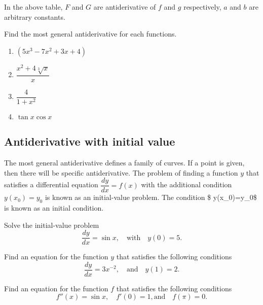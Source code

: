 In the above table, \(F\) and \(G\) are antiderivative of \(f\) and
\(g\) respectively, \(a\) and \(b\) are arbitrary constants.

\begin{example}

Find the most general antiderivative for each functions.

\begin{enumerate}
\item
  \((5x^3-7x^2+3x+4)\)
\item
  \(\dfrac{x^2+4\sqrt[3]{x}}{x}\)
\item
  \(\dfrac{4}{1+x^2}\)
\item
  \(\tan x\cos x\)
\end{enumerate}

\end{example}

\hypertarget{antiderivative-with-initial-value}{%
\subsection{Antiderivative with initial
value}\label{antiderivative-with-initial-value}}

The most general antiderivative defines a family of curves. If a point
is given, then there will be specific antiderivative. The problem of
finding a function \(y\) that satisfies a differential equation
\(\dfrac{dy}{dx}=f(x)\) with the additional condition \(y(x_0)=y_0\) is
known as an initial-value problem. The condition \$ y(x\_0)=y\_0\$ is
known as an initial condition.

\begin{example}

Solve the initial-value problem
\[\dfrac{dy}{dx}=\sin x,\quad\text{with}\quad y(0)=5.\]

\end{example}
\vspace*{6\baselineskip}

\begin{example}

Find an equation for the function \(y\) that satisfies the following
conditions \[\dfrac{dy}{dx}=3x^{-2},\quad\text{and}\quad y(1)=2.\]

\end{example}
\vspace*{6\baselineskip}

\begin{example}

Find an equation for the function \(f\) that satisfies the following
conditions \[f''(x)=\sin x,\quad f'(0)=1, \text{and}\quad f(\pi)=0.\]

\end{example}
\vspace*{6\baselineskip}

